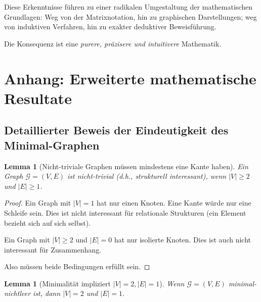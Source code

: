 \documentclass[12pt, a4paper]{article}
\newtheorem{lemma}[theorem]{Lemma}
\theoremstyle{definition}
\theoremstyle{remark}
\newcommand{\Graph}{\mathcal{G}}
\begin{document}
Diese Erkenntnisse führen zu einer radikalen Umgestaltung der mathematischen Grundlagen: Weg von der Matrixnotation, hin zu graphischen Darstellungen; weg von induktiven Verfahren, hin zu exakter deduktiver Beweisführung.

Die Konsequenz ist eine \emph{purere, präzisere und intuitivere} Mathematik.

\appendix

\section{Anhang: Erweiterte mathematische Resultate}
\label{sec:anhang}

\subsection{Detaillierter Beweis der Eindeutigkeit des Minimal-Graphen}
\label{subsec:anhang_eindeutigkeit}

\begin{lemma}[Nicht-triviale Graphen müssen mindestens eine Kante haben]
\label{lem:anhang_nicht_trivial}
Ein Graph $\Graph = (V, E)$ ist \emph{nicht-trivial} (d.h., strukturell interessant), wenn $|V| \geq 2$ und $|E| \geq 1$.
\end{lemma}

\begin{proof}
Ein Graph mit $|V| = 1$ hat nur einen Knoten. Eine Kante würde nur eine Schleife sein. Dies ist nicht interessant für relationale Strukturen (ein Element bezieht sich auf sich selbst).

Ein Graph mit $|V| \geq 2$ und $|E| = 0$ hat nur isolierte Knoten. Dies ist auch nicht interessant für Zusammenhang.

Also müssen beide Bedingungen erfüllt sein.
\end{proof}

\begin{lemma}[Minimalität impliziert $|V| = 2, |E| = 1$]
\label{lem:anhang_minimalitaet}
Wenn $\Graph = (V, E)$ minimal-nichtleer ist, dann $|V| = 2$ und $|E| = 1$.
\end{lemma}
\end{document}
